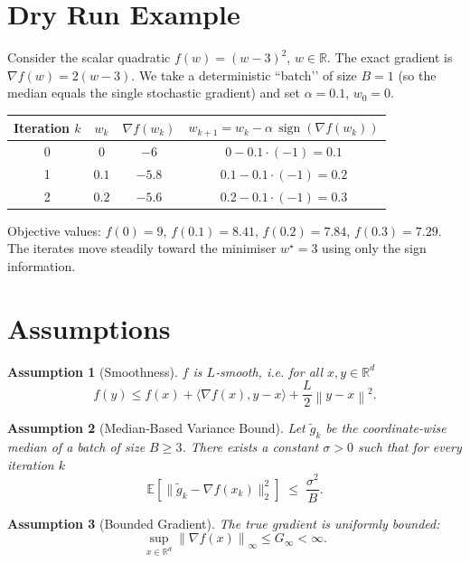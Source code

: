 \documentclass{article}
\newtheorem{assumption}{Assumption}
\newcommand{\sign}{\operatorname{sign}}
\newcommand{\EE}{\mathbb{E}}
\newcommand{\RR}{\mathbb{R}}
\newcommand{\norm}[1]{\left\lVert#1\right\rVert}
\begin{document}
\section*{Dry Run Example}
Consider the scalar quadratic $f(w)=(w-3)^{2}$, $w\in\RR$.  
The exact gradient is $\nabla f(w)=2(w-3)$.  
We take a deterministic “batch’’ of size $B=1$ (so the median equals the single stochastic gradient) and set $\alpha=0.1$, $w_{0}=0$.

\begin{center}
\begin{tabular}{c|c|c|c}
Iteration $k$ & $w_{k}$ & $\nabla f(w_{k})$ & $w_{k+1}=w_{k}-\alpha\,\sign(\nabla f(w_{k}))$\\ \hline
0 & $0$ & $-6$ & $0-0.1\cdot(-1)=0.1$\\[2mm]
1 & $0.1$ & $-5.8$ & $0.1-0.1\cdot(-1)=0.2$\\[2mm]
2 & $0.2$ & $-5.6$ & $0.2-0.1\cdot(-1)=0.3$\\[2mm]
\end{tabular}
\end{center}
Objective values:
$f(0)=9$, $f(0.1)=8.41$, $f(0.2)=7.84$, $f(0.3)=7.29$.  
The iterates move steadily toward the minimiser $w^{\star}=3$ using only the sign information.

\newpage

\section*{Assumptions}
\begin{assumption}[Smoothness]\label{as:smooth}
$f$ is $L$‑smooth, i.e. for all $x,y\in\RR^{d}$
\[
f(y)\le f(x)+\langle \nabla f(x),y-x\rangle+\frac{L}{2}\norm{y-x}^{2}.
\tag{A1}
\]
\end{assumption}

\begin{assumption}[Median‑Based Variance Bound]\label{as:median}
Let $\tilde g_{k}$ be the coordinate‑wise median of a batch of size $B\ge 3$.
There exists a constant $\sigma>0$ such that for every iteration $k$
\[
\EE\!\left[\bigl\|\tilde g_{k}-\nabla f(x_{k})\bigr\|_{2}^{2}\right]
\;\le\; \frac{\sigma^{2}}{B}.
\tag{A2}
\]
\end{assumption}

\begin{assumption}[Bounded Gradient]\label{as:bound}
The true gradient is uniformly bounded:
\[
\sup_{x\in\RR^{d}}\norm{\nabla f(x)}_{\infty}\le G_{\infty}<\infty .
\tag{A3}
\]
\end{assumption}
\end{document}
